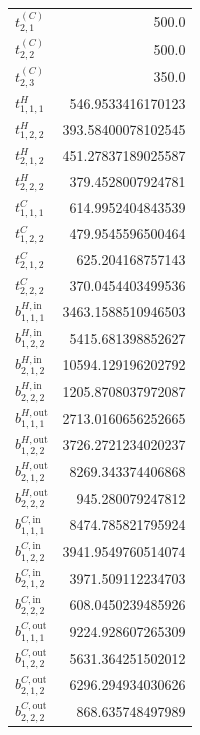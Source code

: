 \documentclass{article}%
\begin{document}
\begin{multicols*}{3}
\begin{supertabular}{lr}
	$t_{2,1}^{(C)}$ & 500.0 \\%
	$t_{2,2}^{(C)}$ & 500.0 \\%
	$t_{2,3}^{(C)}$ & 350.0 \\%
	$t_{1,1,1}^{H}$ & 546.9533416170123 \\%
	$t_{1,2,2}^{H}$ & 393.58400078102545 \\%
	$t_{2,1,2}^{H}$ & 451.27837189025587 \\%
	$t_{2,2,2}^{H}$ & 379.4528007924781 \\%
	$t_{1,1,1}^{C}$ & 614.9952404843539 \\%
	$t_{1,2,2}^{C}$ & 479.9545596500464 \\%
	$t_{2,1,2}^{C}$ & 625.204168757143 \\%
	$t_{2,2,2}^{C}$ & 370.0454403499536 \\%
	$b_{1,1,1}^{H,\text{in}}$ & 3463.1588510946503 \\%
	$b_{1,2,2}^{H,\text{in}}$ & 5415.681398852627 \\%
	$b_{2,1,2}^{H,\text{in}}$ & 10594.129196202792 \\%
	$b_{2,2,2}^{H,\text{in}}$ & 1205.8708037972087 \\%
	$b_{1,1,1}^{H,\text{out}}$ & 2713.0160656252665 \\%
	$b_{1,2,2}^{H,\text{out}}$ & 3726.2721234020237 \\%
	$b_{2,1,2}^{H,\text{out}}$ & 8269.343374406868 \\%
	$b_{2,2,2}^{H,\text{out}}$ & 945.280079247812 \\%
	$b_{1,1,1}^{C,\text{in}}$ & 8474.785821795924 \\%
	$b_{1,2,2}^{C,\text{in}}$ & 3941.9549760514074 \\%
	$b_{2,1,2}^{C,\text{in}}$ & 3971.509112234703 \\%
	$b_{2,2,2}^{C,\text{in}}$ & 608.0450239485926 \\%
	$b_{1,1,1}^{C,\text{out}}$ & 9224.928607265309 \\%
	$b_{1,2,2}^{C,\text{out}}$ & 5631.364251502012 \\%
	$b_{2,1,2}^{C,\text{out}}$ & 6296.294934030626 \\%
	$b_{2,2,2}^{C,\text{out}}$ & 868.635748497989 \\%
\end{supertabular}%
\end{multicols*}%
\clearpage%
\end{document}
